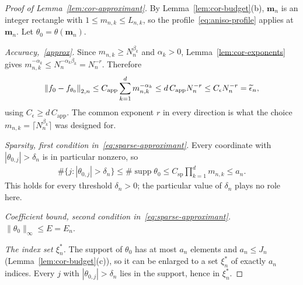 \begin{proof}[Proof of Lemma~\ref{lem:cor-approximant}]
By Lemma~\ref{lem:cor-budget}(b), $\boldsymbol m_n$ is an integer rectangle with $1\leq m_{n,k}\leq L_{n,k}$, so the profile~\eqref{eq:aniso-profile} applies at $\boldsymbol m_n$. Let $\theta_0=\theta(\boldsymbol m_n)$.

\emph{Accuracy,~\eqref{approx}.} Since $m_{n,k}\geq N_n^{\beta_k}$ and $\alpha_k>0$, Lemma~\ref{lem:cor-exponents} gives $m_{n,k}^{-\alpha_k}\leq N_n^{-\alpha_k\beta_k}=N_n^{-r}$. Therefore
\begin{align*}
\left\lVert f_0-f_{\theta_0} \right\rVert_{2,n}\leq C_{\mathrm{app}}\sum_{k=1}^dm_{n,k}^{-\alpha_k}\leq d\,C_{\mathrm{app}}N_n^{-r}\leq C_\epsilon N_n^{-r}=\widetilde{\epsilon}_n,
\end{align*}
using $C_\epsilon\geq d\,C_{\mathrm{app}}$. The common exponent $r$ in every direction is what the choice $m_{n,k}=\lceil N_n^{\beta_k}\rceil$ was designed for.

\emph{Sparsity, first condition in~\eqref{eq:sparse-approximant}.} Every coordinate with $|\theta_{0,j}|>\delta_n$ is in particular nonzero, so
\begin{align*}
\#\{j:|\theta_{0,j}|>\delta_n\}\leq\#\operatorname{supp}\theta_0\leq C_{\mathrm{sp}}\prod_{k=1}^dm_{n,k}\leq a_n.
\end{align*}
This holds for every threshold $\delta_n>0$; the particular value of $\delta_n$ plays no role here.

\emph{Coefficient bound, second condition in~\eqref{eq:sparse-approximant}.} $\|\theta_0\|_\infty\leq E=E_n$.

\emph{The index set $\xi_n^*$.} The support of $\theta_0$ has at most $a_n$ elements and $a_n\leq J_n$ (Lemma~\ref{lem:cor-budget}(c)), so it can be enlarged to a set $\xi_n^*$ of exactly $a_n$ indices. Every $j$ with $|\theta_{0,j}|>\delta_n$ lies in the support, hence in $\xi_n^*$.
\end{proof}

